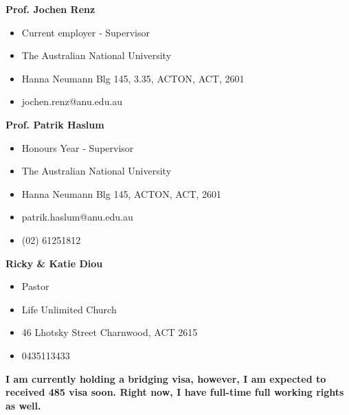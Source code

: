 \documentclass[11pt, a4paper]{awesome-cv}
\begin{document}
\begin{cvletter}
\textbf{Prof. Jochen Renz}
\begin{itemize}
	\item Current employer ‑ Supervisor
	\item The Australian National University
	\item Hanna Neumann Blg 145, 3.35, ACTON, ACT, 2601
	\item jochen.renz@anu.edu.au
\end{itemize}

\textbf{Prof. Patrik Haslum}
\begin{itemize}
	\item Honours Year ‑ Supervisor
	\item The Australian National University
	\item Hanna Neumann Blg 145, ACTON, ACT, 2601
	\item patrik.haslum@anu.edu.au
	\item (02) 61251812
\end{itemize}

\textbf{Ricky \& Katie Diou}
\begin{itemize}
	\item Pastor
	\item Life Unlimited Church
	\item 46 Lhotsky Street Charnwood, ACT 2615
	\item 0435113433
\end{itemize}


\textbf{I am currently holding a bridging visa, however,  I am expected to received 485 visa soon. Right now, I have full-time full working rights as well.}
\end{cvletter}


\makeletterclosing
\end{document}
